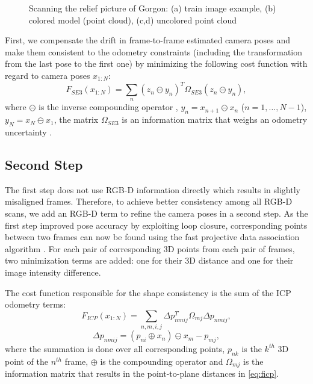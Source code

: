 \documentclass[letterpaper, 10 pt, conference]{ieeeconf}  %
\begin{document}
\begin{figure}[t]
\begin{subfigure}[b]{0.45\linewidth}
                \caption{}
        \end{subfigure}
        \caption{Scanning the relief picture of Gorgon: (a) train image example,
        (b) colored model (point cloud), (c,d) uncolored point cloud}
        \label{fig:gorgon}
\end{figure}

First, we compensate the drift in frame-to-frame estimated camera poses and 
make them consistent to the odometry constraints (including the transformation from the last pose
to the first one) by minimizing the following cost function
with regard to camera poses $x_{1:N}$:
\begin{equation} \label{eq:ffirst}
F_{SE3}(x_{1:N}) = \sum_n (z_n \ominus y_n)^T \Omega_{SE3} (z_n \ominus y_n),
\end{equation}
where $\ominus$ is the inverse compounding operator \cite{lu1997globally},
$y_n=x_{n+1} \ominus x_{n}$ ($n=1,\dots, N-1$), $y_N=x_N \ominus x_1$,
the matrix $\Omega_{SE3}$ is an information matrix that weighs an odometry uncertainty \cite{kuemmerle2011g2o}.

\subsection{Second Step}

The first step does not use RGB-D information directly which results in
slightly misaligned frames. Therefore, to achieve better consistency among all RGB-D scans, we add an RGB-D term to 
refine the camera poses in a second step.
As the first step improved pose accuracy by exploiting loop closure, 
corresponding points between two frames can now be found using
the fast projective data association algorithm \cite{rusinkiewicz2001efficient}.
For each pair of corresponding 3D points from each pair of frames, two minimization terms are added: one 
for their 3D distance and one for their image intensity difference.

The cost function responsible for the shape 
consistency is the sum of the ICP odometry terms:
\begin{equation} \label{eq:ficp}
    F_{ICP}(x_{1:N}) = \sum_{n,m,i,j} \Delta p_{nmij}^T \Omega_{mj} \Delta p_{nmij},
\end{equation}
\begin{equation}
    \Delta p_{nmij}=(p_{ni} \oplus x_n) \ominus x_m - p_{mj},
\end{equation}
where the summation is done over all corresponding points, $p_{nk}$ is the $k^{th}$ 3D point of 
the $n^{th}$ frame, $\oplus$ is 
the compounding operator \cite{lu1997globally} and $\Omega_{mj}$ is 
the information matrix that results in the point-to-plane 
distances in \eqref{eq:ficp}.
\end{document}
